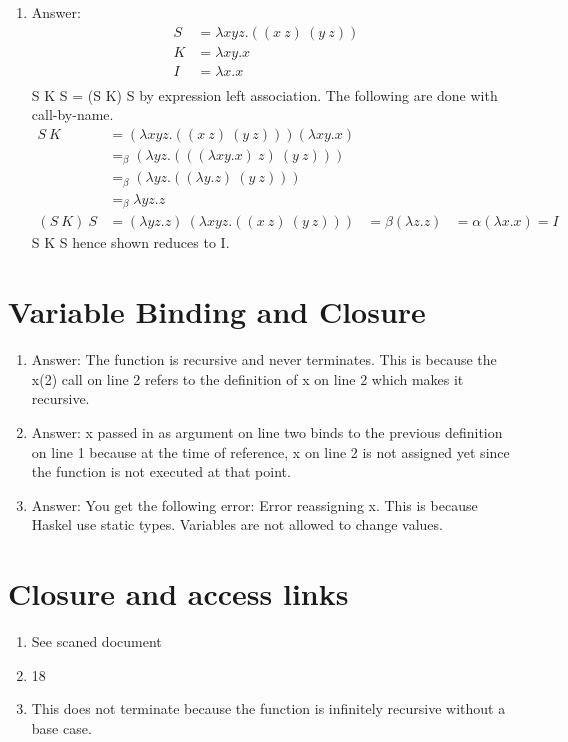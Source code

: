 \documentclass{article}
\begin{document}
\begin{enumerate}
	\item Answer: 
		\begin{align*}
			S &= \lambda xyz.((x\ z)\ (y\ z))&\\
			K &= \lambda xy.x &\\
			I &= \lambda x.x&\\
		\end{align*}
		S K S = (S K) S by expression left association. The following are done with
		call-by-name.
		\begin{align*}
			S\ K &= (\lambda xyz.((x\ z)\ (y\ z))) (\lambda xy.x) &\\
					 &=_{\beta} (\lambda yz.(((\lambda xy.x)\ z)\ (y\ z)))&\\
					 &=_{\beta} (\lambda yz.((\lambda y.z)\ (y\ z)))&\\
					 &=_{\beta} \lambda yz.z&\\
			(S\ K)\ S &= (\lambda yz.z)\ (\lambda xyz.((x\ z)\ (y\ z)))
					 &={\beta} (\lambda z.z)
					 &={\alpha} (\lambda x.x) = I
		\end{align*}
		S K S hence shown reduces to I.
\end{enumerate}

\section{Variable Binding and Closure}
\begin{enumerate}
	\item Answer: The function is recursive and never terminates. This is because
		the x(2) call on line 2 refers to the definition of x on line 2 which makes
		it recursive.
	\item Answer: x passed in as argument on line two binds to the previous
		definition on line 1 because at the time of reference, x on line 2 is not
		assigned yet since the function is not executed at that point.
	\item Answer: You get the following error: Error reassigning x. This is
		because Haskel use static types. Variables are not allowed to change values.
\end{enumerate}

\section{Closure and access links}
	\begin{enumerate}
		\item See scaned document

		\item 18

		\item This does not terminate because the function is infinitely recursive
			without a base case.
	\end{enumerate}
\end{document}
